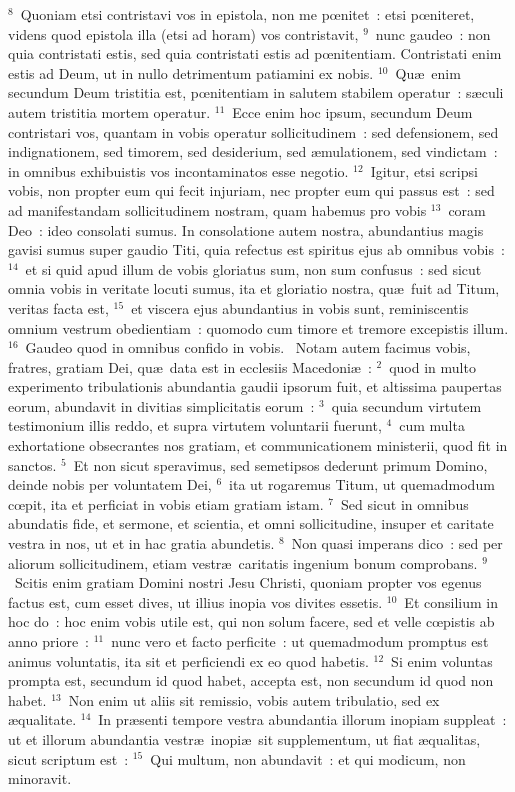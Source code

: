 ${}^{8}$~Quoniam etsi contristavi vos in epistola, non me pœnitet~: etsi pœniteret, videns quod epistola illa (etsi ad horam) vos contristavit,
${}^{9}$~nunc gaudeo~: non quia contristati estis, sed quia contristati estis ad pœnitentiam. Contristati enim estis ad Deum, ut in nullo detrimentum patiamini ex nobis.
${}^{10}$~Qu\ae\ enim secundum Deum tristitia est, pœnitentiam in salutem stabilem operatur~: s\ae culi autem tristitia mortem operatur.
${}^{11}$~Ecce enim hoc ipsum, secundum Deum contristari vos, quantam in vobis operatur sollicitudinem~: sed defensionem, sed indignationem, sed timorem, sed desiderium, sed \ae mulationem, sed vindictam~: in omnibus exhibuistis vos incontaminatos esse negotio.
${}^{12}$~Igitur, etsi scripsi vobis, non propter eum qui fecit injuriam, nec propter eum qui passus est~: sed ad manifestandam sollicitudinem nostram, quam habemus pro vobis
${}^{13}$~coram Deo~: ideo consolati sumus. In consolatione autem nostra, abundantius magis gavisi sumus super gaudio Titi, quia refectus est spiritus ejus ab omnibus vobis~:
${}^{14}$~et si quid apud illum de vobis gloriatus sum, non sum confusus~: sed sicut omnia vobis in veritate locuti sumus, ita et gloriatio nostra, qu\ae\ fuit ad Titum, veritas facta est,
${}^{15}$~et viscera ejus abundantius in vobis sunt, reminiscentis omnium vestrum obedientiam~: quomodo cum timore et tremore excepistis illum.
${}^{16}$~Gaudeo quod in omnibus confido in vobis.
~Notam autem facimus vobis, fratres, gratiam Dei, qu\ae\ data est in ecclesiis Macedoni\ae~:
${}^{2}$~quod in multo experimento tribulationis abundantia gaudii ipsorum fuit, et altissima paupertas eorum, abundavit in divitias simplicitatis eorum~:
${}^{3}$~quia secundum virtutem testimonium illis reddo, et supra virtutem voluntarii fuerunt,
${}^{4}$~cum multa exhortatione obsecrantes nos gratiam, et communicationem ministerii, quod fit in sanctos.
${}^{5}$~Et non sicut speravimus, sed semetipsos dederunt primum Domino, deinde nobis per voluntatem Dei,
${}^{6}$~ita ut rogaremus Titum, ut quemadmodum cœpit, ita et perficiat in vobis etiam gratiam istam.
${}^{7}$~Sed sicut in omnibus abundatis fide, et sermone, et scientia, et omni sollicitudine, insuper et caritate vestra in nos, ut et in hac gratia abundetis.
${}^{8}$~Non quasi imperans dico~: sed per aliorum sollicitudinem, etiam vestr\ae\ caritatis ingenium bonum comprobans.
${}^{9}$~Scitis enim gratiam Domini nostri Jesu Christi, quoniam propter vos egenus factus est, cum esset dives, ut illius inopia vos divites essetis.
${}^{10}$~Et consilium in hoc do~: hoc enim vobis utile est, qui non solum facere, sed et velle cœpistis ab anno priore~:
${}^{11}$~nunc vero et facto perficite~: ut quemadmodum promptus est animus voluntatis, ita sit et perficiendi ex eo quod habetis.
${}^{12}$~Si enim voluntas prompta est, secundum id quod habet, accepta est, non secundum id quod non habet.
${}^{13}$~Non enim ut aliis sit remissio, vobis autem tribulatio, sed ex \ae qualitate.
${}^{14}$~In pr\ae senti tempore vestra abundantia illorum inopiam suppleat~: ut et illorum abundantia vestr\ae\ inopi\ae\ sit supplementum, ut fiat \ae qualitas, sicut scriptum est~:
${}^{15}$~Qui multum, non abundavit~: et qui modicum, non minoravit.


